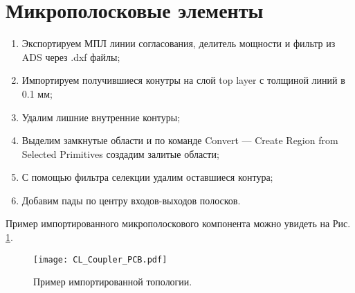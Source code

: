 \section{Микрополосковые элементы}
\begin{enumerate}
	\item Экспортируем МПЛ линии согласования, делитель мощности и фильтр из ADS через .dxf файлы; 
	\item Импортируем получившиеся конутры на слой top layer с толщиной линий в 0.1 мм;
	\item Удалим лишние внутренние контуры;
	\item Выделим замкнутые области и по команде Convert --- Create Region from Selected Primitives создадим залитые области;
	\item С помощью фильтра селекции удалим оставшиеся контура;
	\item Добавим пады по центру входов-выходов полосков.
\end{enumerate}
Пример импортированного микрополоскового компонента можно увидеть на Рис. \ref{fig:CL_Coupler_PCB}.
\begin{figure}[H]
	\centering
	\texttt{[image: CL\_Coupler\_PCB.pdf]}
	\caption{Пример импортированной топологии.}%
	\label{fig:CL_Coupler_PCB}
\end{figure}
